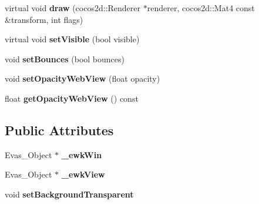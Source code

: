 \begin{DoxyCompactItemize}
\mbox{\label{classcocos2d_1_1experimental_1_1ui_1_1WebViewImpl_a6700c213e88ff41ed17284fb1b2d8321}} 
virtual void {\bfseries draw} (cocos2d\+::\+Renderer $\ast$renderer, cocos2d\+::\+Mat4 const \&transform, int flags)
\item 
\mbox{\label{classcocos2d_1_1experimental_1_1ui_1_1WebViewImpl_a64605c9410d5a5d2f08cefd99072118c}} 
virtual void {\bfseries set\+Visible} (bool visible)
\item 
\mbox{\label{classcocos2d_1_1experimental_1_1ui_1_1WebViewImpl_aac84c819f33d1a68b0f0a81c92bc84cb}} 
void {\bfseries set\+Bounces} (bool bounces)
\item 
\mbox{\label{classcocos2d_1_1experimental_1_1ui_1_1WebViewImpl_a15cccc1087758dec5d0e6f9d5c0bff6e}} 
void {\bfseries set\+Opacity\+Web\+View} (float opacity)
\item 
\mbox{\label{classcocos2d_1_1experimental_1_1ui_1_1WebViewImpl_a006a092dc83912ca74abda9467eb0bc0}} 
float {\bfseries get\+Opacity\+Web\+View} () const
\end{DoxyCompactItemize}
\subsection*{Public Attributes}
\begin{DoxyCompactItemize}
\item 
\mbox{\label{classcocos2d_1_1experimental_1_1ui_1_1WebViewImpl_a08e57a2d6cdf3fe83933e40cac3febb1}} 
Evas\+\_\+\+Object $\ast$ {\bfseries \+\_\+ewk\+Win}
\item 
\mbox{\label{classcocos2d_1_1experimental_1_1ui_1_1WebViewImpl_a53a9a53d00ffc063961b76ffc6deffdc}} 
Evas\+\_\+\+Object $\ast$ {\bfseries \+\_\+ewk\+View}
\item 
\mbox{\label{classcocos2d_1_1experimental_1_1ui_1_1WebViewImpl_a4b6dc3e94a92bb3682570d7752d2f260}} 
void {\bfseries set\+Background\+Transparent}
\end{DoxyCompactItemize}


